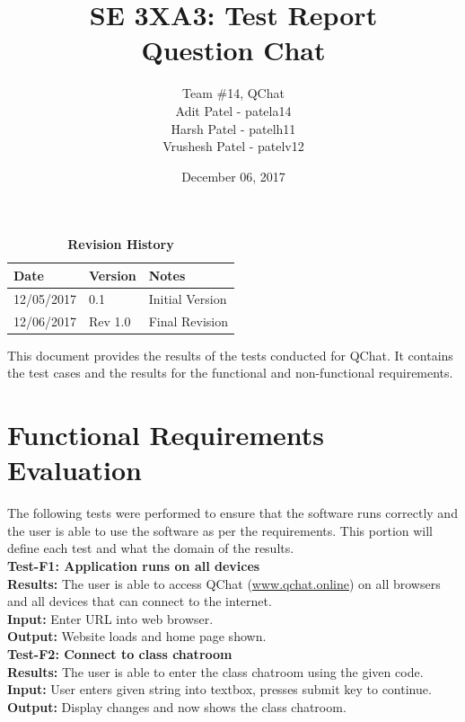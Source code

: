 \documentclass[12pt, titlepage]{article}
\title{SE 3XA3: Test Report\\Question Chat}
\author{Team \#14, QChat
		\\ Adit Patel - patela14
		\\ Harsh Patel - patelh11
		\\ Vrushesh Patel - patelv12
}
\date{December 06, 2017}
\begin{document}
\maketitle

\tableofcontents
\listoftables

\begin{table}[H]   
\caption{\bf Revision History}
\begin{tabularx}{\textwidth}{p{3cm}p{2cm}X}
\toprule {\bf Date} & {\bf Version} & {\bf Notes}\\
\midrule
12/05/2017 & 0.1 & Initial Version\\
12/06/2017 & Rev 1.0 & Final Revision\\
\bottomrule
\end{tabularx}
\end{table}

\newpage


This document provides the results of the tests conducted for QChat. It contains the test cases and the results for the functional and non-functional requirements.  

\section{Functional Requirements Evaluation}
The following tests were performed to ensure that the software runs correctly and the user is able to use the software as per the requirements. This portion will define each test and what the domain of the results. \\

\noindent\textbf{Test-F1: Application runs on all devices} \\
\textbf{Results:} The user is able to access QChat (\href{www.qchat.online}{www.qchat.online}) on all browsers and all devices that can connect to the internet. \\
\textbf{Input:} Enter URL into web browser. \\
\textbf{Output:} Website loads and home page shown. \\

\noindent\textbf{Test-F2: Connect to class chatroom} \\
\textbf{Results:} The user is able to enter the class chatroom using the given code.  \\
\textbf{Input:} User enters given string into textbox, presses submit key to continue. \\
\textbf{Output:} Display changes and now shows the class chatroom. \\
\end{document}
